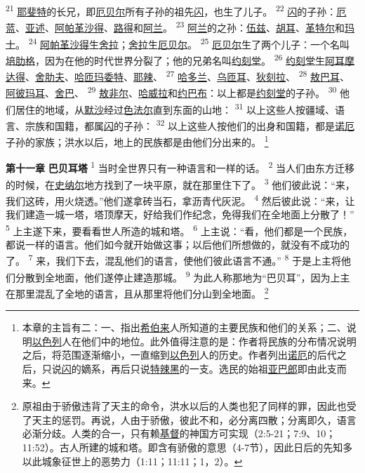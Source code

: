 \textsuperscript{21}
\uline{耶斐特}的长兄，即\uline{厄贝尔}所有子孙的祖先\uline{闪}，也生了儿子。
\textsuperscript{22}
\uline{闪}的子孙：\uline{厄蓝}、\uline{亚述}、\uline{阿帕革}\uline{沙得}、\uline{路得}和\uline{阿兰}。
\textsuperscript{23}
\uline{阿兰}的之孙：\uline{伍兹}、\uline{胡耳}、\uline{革特尔}和\uline{玛士}。
\textsuperscript{24}
\uline{阿帕革}\uline{沙得}生\uline{舍拉}；\uline{舍拉}生\uline{厄贝尔}。
\textsuperscript{25}
\uline{厄贝尔}生了两个儿子：一个名叫\uline{培肋格}，因为在他的时代世界分裂了；他的兄弟名叫\uline{约刻堂}。
\textsuperscript{26}
\uline{约刻堂}生\uline{阿耳}\uline{摩达得}、\uline{舍肋夫}、\uline{哈匝玛委特}、\uline{耶辣}、
\textsuperscript{27}
\uline{哈多兰}、\uline{乌匝耳}、\uline{狄刻拉}、
\textsuperscript{28}
\uline{敖巴耳}、\uline{阿彼玛耳}、\uline{舍巴}、
\textsuperscript{29}
\uline{敖非尔}、\uline{哈威拉}和\uline{约巴布}：以上都是\uline{约刻堂}的子孙。
\textsuperscript{30}
他们居住的地域，从\uline{默沙}经过\uline{色法尔}直到东面的山地：
\textsuperscript{31}
以上这些人按疆域、语言、宗族和国籍，都属\uline{闪}的子孙：
\textsuperscript{32}
以上这些人按他们的出身和国籍，都是\uline{诺厄}子孙的家族；洪水以后，地上的民族都是由他们分出来的。
\footnote{本章的主旨有二：一、指出\uline{希伯来}人所知道的主要民族和他们的关系；二、说明\uline{以色列}人在他们中的地位。此外值得注意的是：作者将民族的分布情况说明之后，将范围逐渐缩小，一直缩到\uline{以色列}人的历史。作者列出\uline{诺厄}的后代之后，只说\uline{闪}的嫡系，再后只说\uline{特辣黑}的一支。选民的始祖\uline{亚巴郎}即由此支而来。}

\textbf{第十一章 }
\textbf{巴贝耳塔 }
\textsuperscript{1}
当时全世界只有一种语言和一样的话。
\textsuperscript{2}
当人们由东方迁移的时候，在\uline{史纳尔}地方找到了一块平原，就在那里住下了。
\textsuperscript{3}
他们彼此说：“来，我们这砖，用火烧透。”他们遂拿砖当石，拿沥青代灰泥。
\textsuperscript{4}
然后彼此说：“来，让我们建造一城一塔，塔顶摩天，好给我们作纪念，免得我们在全地面上分散了！”
\textsuperscript{5}
上主遂下来，要看看世人所造的城和塔。
\textsuperscript{6}
上主说：“看，他们都是一个民族，都说一样的语言。他们如今就开始做这事；以后他们所想做的，就没有不成功的了。
\textsuperscript{7}
来，我们下去，混乱他们的语言，使他们彼此语言不通。”
\textsuperscript{8}
于是上主将他们分散到全地面，他们遂停止建造那城。
\textsuperscript{9}
为此人称那地为“巴贝耳”，因为上主在那里混乱了全地的语言，且从那里将他们分山到全地面。
\footnote{原祖由于骄傲违背了天主的命令，洪水以后的人类也犯了同样的罪，因此也受了天主的惩罚。再说，人由于骄傲，彼此不和，必分离四散；分离即久，语言必渐分歧。人类的合一，只有赖\uline{基督}的神国方可实现（2:5-21；7:9、10；11:52）。古人所建的城和塔。即含有骄傲的意思（4-7节），因此日后的先知多以此城象征世上的恶势力（1:11；11:11；1，2）。}

